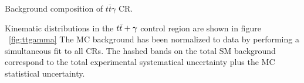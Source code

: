 \begin{table}[htpb]
  \caption{Background composition of $t\bar{t}\gamma$ CR.}
  \begin{center}

    
  \end{center}
  \label{tb:ttVCR_2bj}
\end{table}

\indent Kinematic distributions in the $t\bar{t}+\gamma$ control region are shown in figure ~\ref{fig:ttgamma}  The MC background has been normalized to data by performing a simultaneous fit to all CRs.  The hashed bands on the total SM background correspond to the total experimental systematical uncertainty plus the MC statistical uncertainty.   \\

